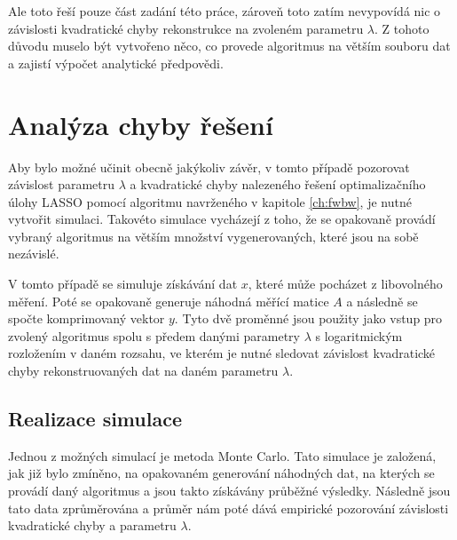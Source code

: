 \documentclass[FM,BP]{tulthesis}
\begin{document}
Ale toto řeší pouze část zadání této práce, zároveň toto zatím nevypovídá nic o závislosti kvadratické chyby rekonstrukce na zvoleném parametru $\lambda$. Z tohoto důvodu muselo být vytvořeno něco, co provede algoritmus na větším souboru dat a zajistí výpočet analytické předpovědi.


\chapter{Analýza chyby řešení}
\label{ch:simulace}
Aby bylo možné učinit obecně jakýkoliv závěr, v tomto případě pozorovat závislost parametru $\lambda$ a kvadratické chyby nalezeného řešení optimalizačního úlohy LASSO pomocí algoritmu navrženého v kapitole \ref{ch:fwbw}, je nutné vytvořit simulaci. Takovéto simulace vycházejí z toho, že se opakovaně provádí vybraný algoritmus na větším množství vygenerovaných, které jsou na sobě nezávislé.

V tomto případě se simuluje získávání dat $x$, které může pocházet z libovolného měření. Poté se opakovaně generuje náhodná měřící matice $A$ a následně se spočte komprimovaný vektor $y$. Tyto dvě proměnné jsou použity jako vstup pro zvolený algoritmus spolu s předem danými parametry $\lambda$ s logaritmickým rozložením v daném rozsahu, ve kterém je nutné sledovat závislost kvadratické chyby rekonstruovaných dat na daném parametru $\lambda$.
\section{Realizace simulace}
Jednou z možných simulací je metoda Monte Carlo. Tato simulace je založená, jak již bylo zmíněno, na opakovaném generování náhodných dat, na kterých se provádí daný algoritmus a jsou takto získávány průběžné výsledky. Následně jsou tato data zprůměrována a průměr nám poté dává empirické pozorování závislosti kvadratické chyby a parametru $\lambda$. 
\end{document}
